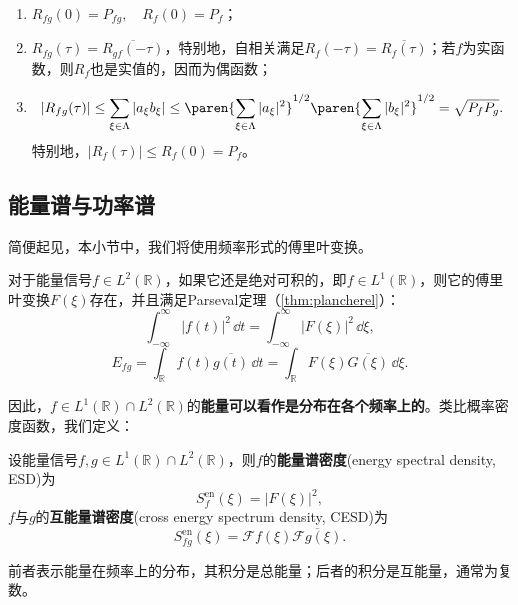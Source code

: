 \begin{proposition}[功率信号的相关函数的性质]
    \begin{enumerate}
        \item $R_{fg}(0)=P_{fg},\quad R_f(0)=P_f$；
        \item $R_{fg}(\tau)=\overline{R_{gf}(-\tau)}$，特别地，自相关满足$R_f(-\tau)=\overline{R_f(\tau)}$；若$f$为实函数，则$R_f$也是实值的，因而为偶函数；
        \item
              \begin{equation}
                  |R_{fg}(\tau)|
                  \le\sum_{\xi\in\Lambda}|a_\xi b_\xi|
                  \le
                  \paren{\sum_{\xi\in\Lambda}|a_\xi|^2}^{1/2}
                  \paren{\sum_{\xi\in\Lambda}|b_\xi|^2}^{1/2}
                  =\sqrt{P_fP_g}.
              \end{equation}
              特别地，$|R_f(\tau)|\le R_f(0)=P_f$。
    \end{enumerate}
\end{proposition}

\subsection{能量谱与功率谱}\label{sub:power_spectrum}

简便起见，本小节中，我们将使用频率形式的傅里叶变换。

对于能量信号$f\in L^2(\mathbb{R})$，如果它还是绝对可积的，即$f\in L^1(\mathbb{R})$，则它的傅里叶变换$F(\xi)$存在，并且满足Parseval定理（\cref{thm:plancherel}）：
\begin{equation}
    \int_{-\infty}^{\infty}|f(t)|^2\,\dd t=\int_{-\infty}^{\infty}|F(\xi)|^2\,\dd\xi,
\end{equation}
\begin{equation}
    E_{fg}=\int_{\mathbb{R}}f(t)\overline{g(t)}\,\dd t=\int_{\mathbb{R}}F(\xi)\overline{G(\xi)}\,\dd\xi.
\end{equation}

因此，$f\in L^1(\mathbb{R})\cap L^2(\mathbb{R})$的\textbf{能量可以看作是分布在各个频率上的}。类比概率密度函数，我们定义：

\begin{definition}[能量谱密度]
    设能量信号$f,g\in L^1(\mathbb{R})\cap L^2(\mathbb{R})$，则$f$的\textbf{能量谱密度}(energy spectral density, ESD)为
    \begin{equation}
        S^{\mathrm{en}}_f(\xi)=|F(\xi)|^2,
    \end{equation}
    $f$与$g$的\textbf{互能量谱密度}(cross energy spectrum density, CESD)为
    \begin{equation}
        S^{\mathrm{en}}_{fg}(\xi)=\mathcal{F}f(\xi)\overline{\mathcal{F}g(\xi)}.
    \end{equation}
\end{definition}
前者表示能量在频率上的分布，其积分是总能量；后者的积分是互能量，通常为复数。

